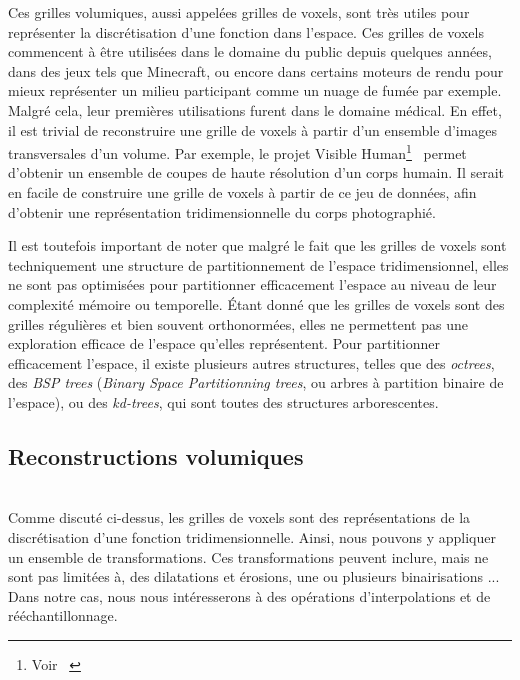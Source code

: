 {{{			Ces grilles volumiques, aussi appelées grilles de voxels, sont très utiles pour représenter la discrétisation d'une fonction dans l'espace. Ces grilles de voxels commencent à être utilisées dans le domaine du public depuis quelques années, dans des jeux tels que Minecraft, ou encore dans certains moteurs de rendu pour mieux représenter un milieu participant comme un nuage de fumée par exemple. Malgré cela, leur premières utilisations furent dans le domaine médical. En effet, il est trivial de reconstruire une grille de voxels à partir d'un ensemble d'images transversales d'un volume. Par exemple, le projet Visible Human\footnote{Voir ~}~\cite{cite_visible_human} permet d'obtenir un ensemble de coupes de haute résolution d'un corps humain. Il serait en facile de construire une grille de voxels à partir de ce jeu de données, afin d'obtenir une représentation tridimensionnelle du corps photographié.\par

			\par

			Il est toutefois important de noter que malgré le fait que les grilles de voxels sont techniquement une structure de partitionnement de l'espace tridimensionnel, elles ne sont pas optimisées pour partitionner efficacement l'espace au niveau de leur complexité mémoire ou temporelle. \'Etant donné que les grilles de voxels sont des grilles régulières et bien souvent orthonormées, elles ne permettent pas une exploration efficace de l'espace qu'elles représentent. Pour partitionner efficacement l'espace, il existe plusieurs autres structures, telles que des \textit{octrees}\cite{cite_octree}, des \textit{BSP trees}\cite{cite_bsp_tree} (\textit{Binary Space Partitionning trees}, ou arbres à partition binaire de l'espace), ou des \textit{kd-trees}\cite{cite_kd_tree}, qui sont toutes des structures arborescentes.
		}

		\subsection{Reconstructions volumiques}
		{
			\\

			Comme discuté ci-dessus, les grilles de voxels sont des représentations de la discrétisation d'une fonction tridimensionnelle. Ainsi, nous pouvons y appliquer un ensemble de transformations. Ces transformations peuvent inclure, mais ne sont pas limitées à, des dilatations et érosions, une ou plusieurs binairisations ... Dans notre cas, nous nous intéresserons à des opérations d'interpolations et de rééchantillonnage.\par
	
}}}

